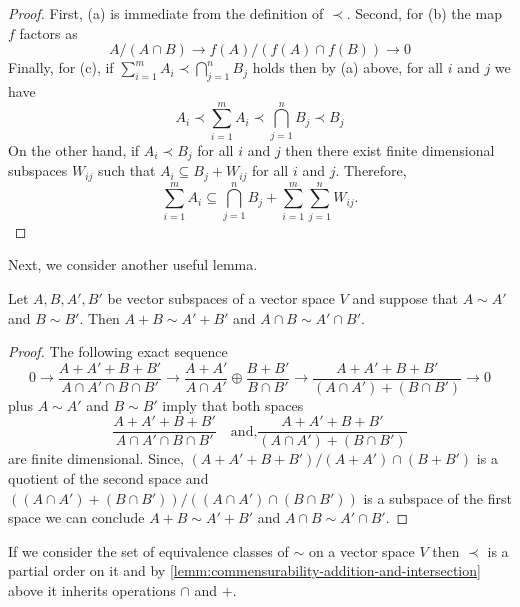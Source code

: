 \begin{proof}
	First, (a) is immediate from the definition of $\prec$. Second, for (b) the map $f$ factors as
	\[
		A/(A\cap B) \to f(A)/(f(A)\cap f(B)) \to 0
	\]
	Finally, for (c), if $\sum_{i=1}^{m} A_{i} \prec \bigcap_{j=1}^{n} B_{j}$ holds then by (a) above, for all $i$ and $j$ we have
	\[
		A_{i} \prec \sum_{i=1}^{m} A_{i} \prec \bigcap_{j=1}^{n} B_{j} \prec B_{j}
	\]
	On the other hand, if $A_{i} \prec B_{j}$ for all $i$ and $j$ then there exist finite dimensional subspaces $W_{ij}$ such that $A_{i} \subseteq B_{j} + W_{ij}$ for all $i$ and $j$. Therefore,
	\[
		\sum_{i=1}^{m} A_{i} \subseteq \bigcap_{j=1}^{n} B_{j} + \sum_{i=1}^{m} \sum_{j=1}^{n} W_{ij}.
	\]

\end{proof}
Next, we consider another useful lemma.
\begin{lemma}\label{lemm:commensurability-addition-and-intersection}
	Let $A,B,A',B'$ be vector subspaces of a vector space $V$ and suppose that $A \sim A'$ and $B \sim B'$. Then $A + B \sim A' + B'$ and $A \cap B \sim A' \cap B'$.
\end{lemma}
\begin{proof}
	The following exact sequence 
	\small
	\[
		0 \to \frac{A + A' + B + B'}{A\cap A'\cap B\cap B'} \to \frac{A + A'}{A \cap A'} \oplus \frac{B + B'}{B \cap B'} \to \frac{A + A' + B + B'}{(A\cap A') + (B\cap B')} \to 0
	\]
	\normalsize
	plus $A \sim A'$ and $B \sim B'$ imply that both spaces
	\[
		\frac{A + A' + B + B'}{A\cap A'\cap B\cap B'} \quad\text{and,}
		 \frac{A + A' + B + B'}{(A\cap A') + (B\cap B')}
	\]	
	are finite dimensional. Since, $(A + A' + B + B')/(A+A')\cap(B+B')$ is a quotient of the second space and $((A \cap A') + (B \cap B'))/((A\cap A')\cap(B\cap B'))$ is a subspace of the first space we can conclude $A + B \sim A' + B'$ and $A \cap B \sim A' \cap B'$.
\end{proof}
If we consider the set of equivalence classes of $\sim$ on a vector space $V$ then $\prec$ is a partial order on it and by \cref{lemm:commensurability-addition-and-intersection} above it inherits operations $\cap$ and $+$.
